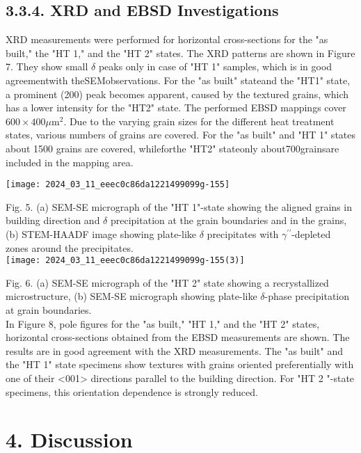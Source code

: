\documentclass[10pt]{article}
\begin{document}
\subsection*{3.3.4. XRD and EBSD Investigations}
XRD measurements were performed for horizontal cross-sections for the "as built," the "HT 1," and the "HT 2" states. The XRD patterns are shown in Figure 7. They show small $\delta$ peaks only in case of "HT 1" samples, which is in good agreementwith theSEMobservations. For the "as built" stateand the "HT1" state, a prominent (200) peak becomes apparent, caused by the textured grains, which has a lower intensity for the "HT2" state. The performed EBSD mappings cover $600 \times 400 \mu \mathrm{m}^{2}$. Due to the varying grain sizes for the different heat treatment states, various numbers of grains are covered. For the "as built" and "HT 1" states about 1500 grains are covered, whileforthe "HT2" stateonly about700grainsare included in the mapping area.

\begin{center}
\texttt{[image: 2024\_03\_11\_eeec0c86da1221499099g-155]}
\end{center}

Fig. 5. (a) SEM-SE micrograph of the "HT 1"-state showing the aligned grains in building direction and $\delta$ precipitation at the grain boundaries and in the grains, (b) STEM-HAADF image showing plate-like $\delta$ precipitates with $\gamma^{\prime \prime}$-depleted zones around the precipitates.\\
\texttt{[image: 2024\_03\_11\_eeec0c86da1221499099g-155(3)]}

Fig. 6. (a) SEM-SE micrograph of the "HT 2" state showing a recrystallized microstructure, (b) SEM-SE micrograph showing plate-like $\delta$-phase precipitation at grain boundaries.\\
In Figure 8, pole figures for the "as built," "HT 1," and the "HT 2" states, horizontal cross-sections obtained from the EBSD measurements are shown. The results are in good agreement with the XRD measurements. The "as built" and the "HT 1" state specimens show textures with grains oriented preferentially with one of their <001> directions parallel to the building direction. For "HT 2 "-state specimens, this orientation dependence is strongly reduced.

\section*{4. Discussion}
\end{document}
